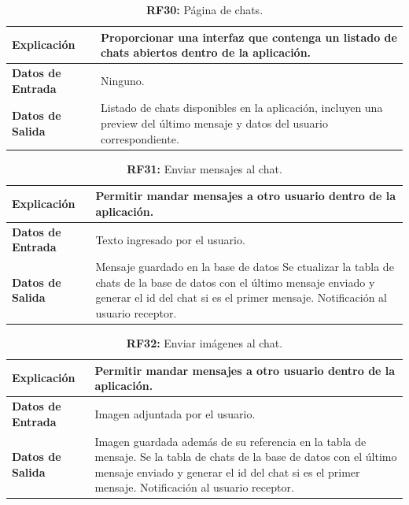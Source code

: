 \documentclass[a4paper, 12pt]{article}
\begin{document}
\begin{table}[H]
\captionsetup{justification=raggedright,singlelinecheck=false}
\caption{\textbf{RF30:} Página de chats.}
\label{tab:RF30}
	\begin{tabular}{|m{5cm}|m{10cm}|}
	\hline
	\textbf{Explicación} & Proporcionar una interfaz que contenga un listado de chats abiertos dentro de la aplicación. \\ 
	\hline
	\textbf{Datos de Entrada} & Ninguno. \\ 
	\hline
	\textbf{Datos de Salida} & Listado de chats disponibles en la aplicación, incluyen una preview del último mensaje y datos del usuario correspondiente. \\ 
	\hline
\end{tabular}
\end{table}


\begin{table}[H]
\captionsetup{justification=raggedright,singlelinecheck=false}
\caption{\textbf{RF31:} Enviar mensajes al chat.}
\label{tab:RF31}
	\begin{tabular}{|m{5cm}|m{10cm}|}
	\hline
	\textbf{Explicación} & Permitir mandar mensajes a otro usuario dentro de la aplicación. \\ 
	\hline
	\textbf{Datos de Entrada} & Texto ingresado por el usuario. \\ 
	\hline
	\textbf{Datos de Salida} & Mensaje guardado en la base de datos Se ctualizar la tabla de chats de la base de datos con el último mensaje enviado y generar el id del chat si es el primer mensaje. Notificación al usuario receptor. \\ 
	\hline
\end{tabular}
\end{table}


\begin{table}[H]
\captionsetup{justification=raggedright,singlelinecheck=false}
\caption{\textbf{RF32:} Enviar imágenes al chat.}
\label{tab:RF32}
	\begin{tabular}{|m{5cm}|m{10cm}|}
\hline
	\textbf{Explicación} & Permitir mandar mensajes a otro usuario dentro de la aplicación. \\ 
	\hline
	\textbf{Datos de Entrada} & Imagen adjuntada por el usuario. \\ 
	\hline
	\textbf{Datos de Salida} & Imagen guardada además de su referencia en la tabla de mensaje. Se la tabla de chats de la base de datos con el último mensaje enviado y generar el id del chat si es el primer mensaje. Notificación al usuario receptor. \\ 
	\hline
\end{tabular}
\end{table}
\end{document}
